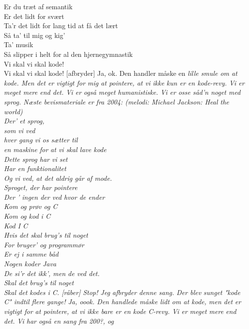 \documentclass[a4paper,11pt]{article}
\begin{document}
\begin{sketch}
         Er du træt af semantik\\
         Er det lidt  for svært\\
         Ta'r det lidt for lang tid at få det lært\\
         Så ta' til mig og kig'\\
         Ta' musik\\
         Så slipper i helt for al den hjernegymnastik\\
         Vi skal vi skal kode!\\
         Vi skal vi skal kode!
[afbryder] Ja, ok. Den handler måske en \em{lille} smule om
         at kode. Men det er vigtigt for mig at pointere, at vi ikke
         kun er en kode-revy. Vi er meget mere end det. Vi er også
         meget humanistiske. Vi er osse såd'n noget med sprog. Næste
         bevismateriale er fra 2004:
 (melodi: Michael Jackson: Heal the world)\\
         Der' et sprog,\\
         som vi ved\\
         hver gang vi os sætter til\\
         en maskine for at vi skal lave kode\\
         Dette sprog har vi set\\
         Har en funktionalitet\\
         Og vi ved, at det aldrig går af mode.\\
         Sproget, der har pointere\\
         Der ' ingen der ved hvor de ender\\
         Kom og prøv og C\\
         Kom og kod i C\\
         Kod I C\\
         Hvis det skal brug's til noget\\
         For bruger' og programmør\\
         Er ej i samme båd\\
         Nogen koder Java\\
         De si'r det ikk', men de ved det.\\
         Skal det brug's til noget\\
         Skal det kodes i C.
[råber] Stop! Jeg afbryder denne sang. Der blev sunget
         "kode C" indtil flere gange!
 Ja, oook. Den handlede måske \em{lidt} om at kode, men  det er    
         vigtigt for at pointere, at vi ikke bare er en kode C-revy.
         Vi er meget mere end det. Vi har også en sang fra 200?, og

\end{sketch}
\end{document}
